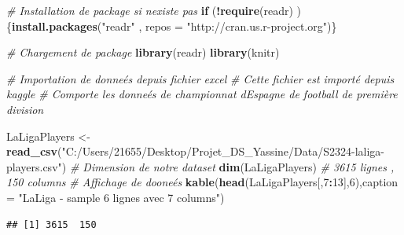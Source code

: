 \documentclass[
  6pt,
]{article}
\newenvironment{Shaded}{\begin{snugshade}}{\end{snugshade}}
\newcommand{\AttributeTok}[1]{\textcolor[rgb]{0.13,0.29,0.53}{#1}}
\newcommand{\CommentTok}[1]{\textcolor[rgb]{0.56,0.35,0.01}{\textit{#1}}}
\newcommand{\ControlFlowTok}[1]{\textcolor[rgb]{0.13,0.29,0.53}{\textbf{#1}}}
\newcommand{\DecValTok}[1]{\textcolor[rgb]{0.00,0.00,0.81}{#1}}
\newcommand{\FunctionTok}[1]{\textcolor[rgb]{0.13,0.29,0.53}{\textbf{#1}}}
\newcommand{\NormalTok}[1]{#1}
\newcommand{\OtherTok}[1]{\textcolor[rgb]{0.56,0.35,0.01}{#1}}
\newcommand{\SpecialCharTok}[1]{\textcolor[rgb]{0.81,0.36,0.00}{\textbf{#1}}}
\newcommand{\StringTok}[1]{\textcolor[rgb]{0.31,0.60,0.02}{#1}}
\begin{document}
\begin{Shaded}
\begin{Highlighting}[]
\CommentTok{\# Installation de package si n\textquotesingle{}existe pas }
\ControlFlowTok{if}\NormalTok{ (}\SpecialCharTok{!}\FunctionTok{require}\NormalTok{(readr) ) \{}\FunctionTok{install.packages}\NormalTok{(}\StringTok{"readr"}\NormalTok{ , }\AttributeTok{repos =} \StringTok{"http://cran.us.r{-}project.org"}\NormalTok{)\}}

\CommentTok{\# Chargement de package }
\FunctionTok{library}\NormalTok{(readr)}
\FunctionTok{library}\NormalTok{(knitr)}


\CommentTok{\# Importation de donneés depuis fichier excel }
\CommentTok{\# Cette fichier est importé depuis kaggle}
\CommentTok{\# Comporte les donneés de championnat d\textquotesingle{}Espagne de football de première division}

\NormalTok{LaLigaPlayers }\OtherTok{\textless{}{-}} \FunctionTok{read\_csv}\NormalTok{(}\StringTok{"C:/Users/21655/Desktop/Projet\_DS\_Yassine/Data/S2324{-}laliga{-}players.csv"}\NormalTok{)}
\CommentTok{\# Dimension de notre dataset }
\FunctionTok{dim}\NormalTok{(LaLigaPlayers) }\CommentTok{\# 3615 lignes , 150 columns }
\CommentTok{\# Affichage de dooneés }
\FunctionTok{kable}\NormalTok{(}\FunctionTok{head}\NormalTok{(LaLigaPlayers[,}\DecValTok{7}\SpecialCharTok{:}\DecValTok{13}\NormalTok{],}\DecValTok{6}\NormalTok{),}\AttributeTok{caption =} \StringTok{"LaLiga {-} sample 6 lignes avec 7 columns"}\NormalTok{)}
\end{Highlighting}
\end{Shaded}

\begin{verbatim}
## [1] 3615  150
\end{verbatim}
\end{document}
